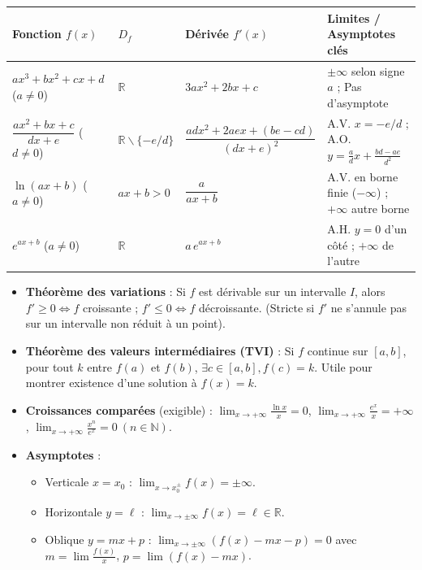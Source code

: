 \documentclass[11pt]{article}
\def\setminus{\mathbin{\backslash}}\let\smallsetminus\setminus
\begin{document}
\begin{aretenir}
\begin{center}
\begin{tabularx}{\linewidth}{|l|X|X|X|}
\hline
\rowcolor{popblueL} \textbf{Fonction $f(x)$} & \textbf{$D_f$} & \textbf{Dérivée $f'(x)$} & \textbf{Limites / Asymptotes clés} \\
\hline
$ax^3+bx^2+cx+d$ ($a\neq 0$) & $\mathbb{R}$ & $3ax^2+2bx+c$ & $\pm\infty$ selon signe $a$ ; Pas d'asymptote \\
\hline
$\dfrac{ax^2+bx+c}{dx+e}$ ($d\neq 0$) & $\mathbb{R}\setminus\{-e/d\}$ & $\dfrac{adx^2+2aex+(be-cd)}{(dx+e)^2}$ & A.V. $x=-e/d$ ; A.O. $y=\frac{a}{d}x+\frac{bd-ae}{d^2}$ \\
\hline
$\ln(ax+b)$ ($a\neq 0$) & $ax+b>0$ & $\dfrac{a}{ax+b}$ & A.V. en borne finie ($-\infty$) ; $+\infty$ autre borne \\
\hline
$e^{ax+b}$ ($a\neq 0$) & $\mathbb{R}$ & $a\,e^{ax+b}$ & A.H. $y=0$ d'un côté ; $+\infty$ de l'autre \\
\hline
\end{tabularx}
\end{center}
\end{aretenir}

\begin{propriete}
\begin{itemize}
  \item \textbf{Théorème des variations} : Si $f$ est dérivable sur un intervalle $I$, alors $f' \geq 0 \iff f$ croissante ; $f' \leq 0 \iff f$ décroissante. (Stricte si $f'$ ne s'annule pas sur un intervalle non réduit à un point).
  \item \textbf{Théorème des valeurs intermédiaires (TVI)} : Si $f$ continue sur $[a,b]$, pour tout $k$ entre $f(a)$ et $f(b)$, $\exists c \in [a,b], f(c)=k$. Utile pour montrer existence d'une solution à $f(x)=k$.
  \item \textbf{Croissances comparées} (exigible) :
    $\lim_{x\to+\infty} \frac{\ln x}{x} = 0$,
    $\lim_{x\to+\infty} \frac{e^x}{x} = +\infty$,
    $\lim_{x\to+\infty} \frac{x^n}{e^x} = 0\ (n\in\mathbb{N})$.
  \item \textbf{Asymptotes} :
    \begin{itemize}
      \item Verticale $x=x_0$ : $\lim_{x\to x_0^\pm} f(x) = \pm\infty$.
      \item Horizontale $y=\ell$ : $\lim_{x\to\pm\infty} f(x) = \ell \in \mathbb{R}$.
      \item Oblique $y=mx+p$ : $\lim_{x\to\pm\infty} (f(x)-mx-p) = 0$ avec $m = \lim \frac{f(x)}{x}$, $p = \lim (f(x)-mx)$.
    \end{itemize}
\end{itemize}
\end{propriete}
\end{document}
